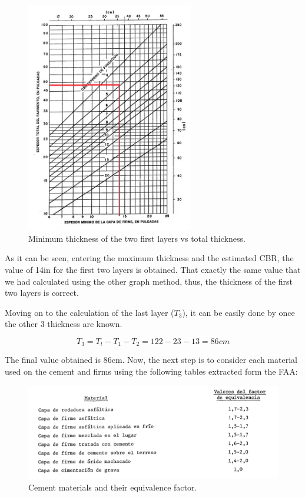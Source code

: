 		\begin{figure}[H]
			\centering
			\includegraphics[clip, trim=0cm 0cm 0cm 0cm, width=0.65\textwidth]{./images/pavement/B777/thicknes2min}
			\caption{Minimum thickness of the two first layers vs total thickness.}
			\label{} %
		\end{figure}
	
		As it can be seen, entering the maximum thickness and the estimated CBR, the value of 14in for the first two layers is obtained. That exactly the same value that we had calculated using the other graph method, thus, the thickness of the first two layers is correct.
	
		Moving on to the calculation of the last layer (\(T_3\)), it can be easily done by once the other 3 thickness are known. 
		
		\[T_3 = T_t - T_1 - T_2 = 122 - 23 - 13 = 86cm\]
		
		The final value obtained is 86cm. Now, the next step is to consider each material used on the cement and firms using the following tables extracted form the FAA:
		
		\begin{figure}[H]
			\centering
			\includegraphics[clip, trim=0cm 0cm 0cm 0cm, width=1\textwidth]{./images/pavement/cemento}
			\caption{Cement materials and their equivalence factor.}
			\label{} %
		\end{figure}
	
